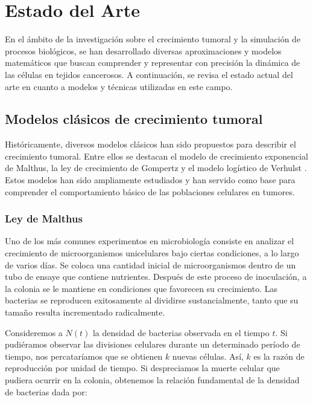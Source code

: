\chapter{Estado del Arte}\label{chapter:state-of-the-art}

En el ámbito de la investigación sobre el crecimiento tumoral y la simulación de procesos biológicos, se han desarrollado diversas aproximaciones y modelos matemáticos que buscan comprender y representar con precisión la dinámica de las células en tejidos cancerosos. A continuación, se revisa el estado actual del arte en cuanto a modelos y técnicas utilizadas en este campo.

\section{Modelos clásicos de crecimiento tumoral}

Históricamente, diversos modelos clásicos han sido propuestos para describir el crecimiento tumoral. Entre ellos se destacan el modelo de crecimiento exponencial de Malthus, la ley de crecimiento de Gompertz y el modelo logístico de Verhulst \cite{viabarre2019}. Estos modelos han sido ampliamente estudiados y han servido como base para comprender el comportamiento básico de las poblaciones celulares en tumores.

\subsection{Ley de Malthus}

Uno de los más comunes experimentos en microbiología consiste en analizar el crecimiento de microorganismos unicelulares bajo ciertas condiciones, a lo largo de varios días. Se coloca una cantidad inicial de microorganismos dentro de un tubo de ensaye que contiene nutrientes. Después de este proceso de inoculación, a la colonia se le mantiene en condiciones que favorecen su crecimiento. Las bacterias se reproducen exitosamente al dividirse sustancialmente, tanto que su tamaño resulta incrementado radicalmente.

Consideremos a $N(t)$ la densidad de bacterias observada en el tiempo $t$. Si pudiéramos observar las divisiones celulares durante un determinado período de tiempo, nos percataríamos que se obtienen $k$ nuevas células. Así, $k$ es la razón de reproducción por unidad de tiempo. Si despreciamos la muerte celular que pudiera ocurrir en la colonia, obtenemos la relación fundamental de la densidad de bacterias dada por:

